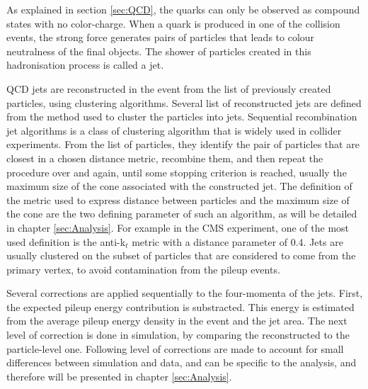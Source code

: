 As explained in section \ref{sec:QCD}, the quarks can only be observed as compound states with no color-charge. When a quark is produced in one of the collision events, the strong force generates pairs of particles that leads to colour neutralness of the final objects. The shower of particles created in this hadronisation process is called a jet.

QCD jets are reconstructed in the event from the list of previously created particles, using clustering algorithms. Several list of reconstructed jets are defined from the method used to cluster the particles into jets. Sequential recombination jet algorithms is a class of clustering algorithm that is widely used in collider experiments. From the list of particles, they identify the pair of particles that are closest in a chosen distance metric, recombine them, and then repeat the procedure over and again, until some stopping criterion is reached, usually the maximum size of the cone associated with the constructed jet. The definition of the metric used to express distance between particles and the maximum size of the cone are the two defining parameter of such an algorithm, as will be detailed in chapter \ref{sec:Analysis}. For example in the CMS experiment, one of the most used definition is the anti-k$_t$ metric with a distance parameter of 0.4. Jets are usually clustered on the subset of particles that are considered to come from the primary vertex, to avoid contamination from the pileup events.

Several corrections are applied sequentially to the four-momenta of the jets. First, the expected pileup energy contribution is substracted. This energy is estimated from the average pileup energy density in the event and the jet area. The next level of correction is done in simulation, by comparing the reconstructed \pt to the particle-level one. Following level of corrections are made to account for small differences between simulation and data, and can be specific to the analysis, and therefore will be presented in chapter \ref{sec:Analysis}.

